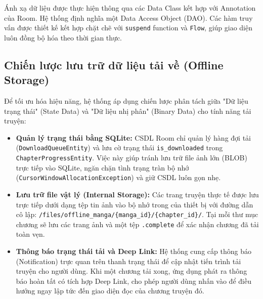Ánh xạ dữ liệu được thực hiện thông qua các Data Class kết hợp với Annotation của Room. Hệ thống định nghĩa một Data Access Object (DAO). Các hàm truy vấn được thiết kế kết hợp chặt chẽ với \texttt{suspend} function và \texttt{Flow}, giúp giao diện luôn đồng bộ hóa theo thời gian thực.



\subsection{Chiến lược lưu trữ dữ liệu tải về (Offline Storage)}

Để tối ưu hóa hiệu năng, hệ thống áp dụng chiến lược phân tách giữa "Dữ liệu trạng thái" (State Data) và "Dữ liệu nhị phân" (Binary Data) cho tính năng tải truyện:

\begin{itemize}
    \item \textbf{Quản lý trạng thái bằng SQLite:} CSDL Room chỉ quản lý hàng đợi tải (\texttt{DownloadQueueEntity}) và lưu cờ trạng thái \texttt{is\_downloaded} trong \\ \texttt{ChapterProgressEntity}. Việc này giúp tránh lưu trữ file ảnh lớn (BLOB) trực tiếp vào SQLite, ngăn chặn tình trạng tràn bộ nhớ \\ (\texttt{CursorWindowAllocationException}) và giữ CSDL luôn gọn nhẹ.
    \item \textbf{Lưu trữ file vật lý (Internal Storage):} Các trang truyện thực tế được lưu trực tiếp dưới dạng tệp tin ảnh vào bộ nhớ trong của thiết bị với đường dẫn cô lập: \texttt{/files/offline\_manga/\{manga\_id\}/\{chapter\_id\}/}. Tại mỗi thư mục chương sẽ lưu các trang ảnh và một tệp \texttt{.complete} để xác nhận chương đã tải toàn vẹn.
    \item \textbf{Thông báo trạng thái tải và Deep Link:} Hệ thống cung cấp thông báo (Notification) trực quan trên thanh trạng thái để cập nhật tiến trình tải truyện cho người dùng. Khi một chương tải xong, ứng dụng phát ra thông báo hoàn tất có tích hợp Deep Link, cho phép người dùng nhấn vào để điều hướng ngay lập tức đến giao diện đọc của chương truyện đó.
\end{itemize}

